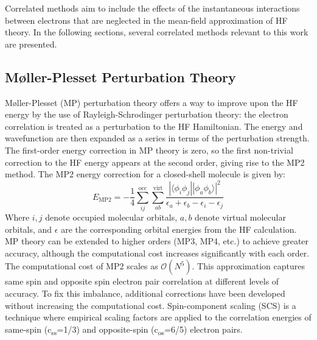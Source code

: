 Correlated methods aim to include the effects of the instantaneous interactions between electrons that are neglected in the mean-field approximation of HF theory. In the following sections, several correlated methods relevant to this work are presented.


\subsection{Møller-Plesset Perturbation Theory}
Møller-Plesset (MP)\cite{shavitt2009many} perturbation theory offers a way to improve upon the HF energy by the use of Rayleigh-Schrodinger perturbation theory: the electron correlation is treated as a perturbation to the HF Hamiltonian. The energy and wavefunction are then expanded as a series in terms of the perturbation strength. The first-order energy correction in MP theory is zero, so the first non-trivial correction to the HF energy appears at the second order, giving rise to the MP2 method. The MP2 energy correction for a closed-shell molecule is given by:
\begin{equation} \label{eq:MP2}
    E_{\mathrm{MP2}} = - \frac{1}{4} \sum_{ij}^{\mathrm{occ}} \sum_{ab}^{\mathrm{virt}} \frac{|\langle \phi_i \phi_j || \phi_a \phi_b \rangle|^2}{\epsilon_a + \epsilon_b - \epsilon_i - \epsilon_j}
\end{equation}
Where $i,j$ denote occupied molecular orbitals, $a,b$ denote virtual molecular orbitals, and $\epsilon$ are the corresponding orbital energies from the HF calculation. MP theory can be extended to higher orders (MP3, MP4, etc.) to achieve greater accuracy, although the computational cost increases significantly with each order. The computational cost of MP2 scales as $\mathcal{O}(N^5)$. This approximation captures same spin and opposite spin electron pair correlation at different levels of accuracy. To fix this imbalance, additional corrections have been developed without increasing the computational cost. Spin-component scaling (SCS)\cite{grimme2003improved} is a technique where empirical scaling factors are applied to the correlation energies of same-spin (c\textsubscript{ss}=1/3) and opposite-spin (c\textsubscript{os}=6/5) electron pairs.

